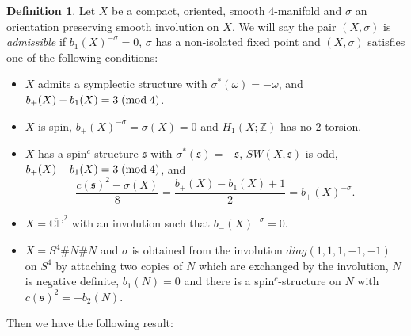 \documentclass{amsart}
\theoremstyle{definition}
\newtheorem{definition}[theorem]{Definition}
\theoremstyle{remark}
\numberwithin{equation}{section}
\begin{document}
\begin{definition}
Let $X$ be a compact, oriented, smooth $4$-manifold and $\sigma$ an orientation preserving smooth involution on $X$. We will say the pair $(X , \sigma)$ is {\em admissible} if $b_1(X)^{-\sigma} = 0$, $\sigma$ has a non-isolated fixed point and $(X,\sigma)$ satisfies one of the following conditions:
\begin{itemize}
\item[(1)]{$X$ admits a symplectic structure with $\sigma^*(\omega) = -\omega$, and $b_+(X) - b_1(X) = 3 \; ({\rm mod} \; 4)$.}
\item[(2)]{$X$ is spin, $b_+(X)^{-\sigma} = \sigma(X) = 0$ and $H_1(X ; \mathbb{Z})$ has no $2$-torsion.}
\item[(3)]{$X$ has a spin$^c$-structure $\mathfrak{s}$ with $\sigma^*(\mathfrak{s}) = -\mathfrak{s}$, $SW(X,\mathfrak{s})$ is odd, $b_+(X) - b_1(X) = 3 \; ({\rm mod} \; 4)$, and
\[
\frac{ c(\mathfrak{s})^2 - \sigma(X) }{8} = \frac{ b_+(X) - b_1(X) + 1}{2} = b_+(X)^{-\sigma}.
\]
}
\item[(4)]{$X = \overline{\mathbb{CP}}^2$ with an involution such that $b_-(X)^{-\sigma} = 0$.}
\item[(5)]{$X = S^4 \# N \# N$ and $\sigma$ is obtained from the involution $diag(1,1,1,-1,-1)$ on $S^4$ by attaching two copies of $N$ which are exchanged by the involution, $N$ is negative definite, $b_1(N) = 0$ and there is a spin$^c$-structure on $N$ with $c(\mathfrak{s})^2 = -b_2(N)$.}
\end{itemize}

\end{definition}

Then we have the following result:
\end{document}
